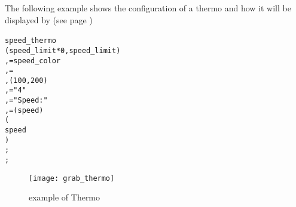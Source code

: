 \vspace{0.5cm}

The following example shows the configuration of a thermo
and how it will be displayed by \INTENS{} (see page \pageref{fig:thermo})

\begin{boxedminipage}[t]{\linewidth}
\begin{alltt}
\UIMANAGER
  \THERMO
    speed_thermo {
      \RANGE ( speed_limit*0, speed_limit )
    , \COLOR = speed_color
    , \ORIENTATION = \VERTICAL
    , \SIZE ( 100, 200 )
    , \FORMAT = "4"
    , \LABEL = "Speed:"
    , \UNIT = \UNIT(speed)
    } ( 
      speed
    )
  ;
\END \UIMANAGER;
\end{alltt}
\end{boxedminipage}

\begin{figure}[h]\label{fig:thermo}
   \begin{center}
      \texttt{[image: grab\_thermo]}
   \end{center}
\caption{example of Thermo}
\end{figure}

